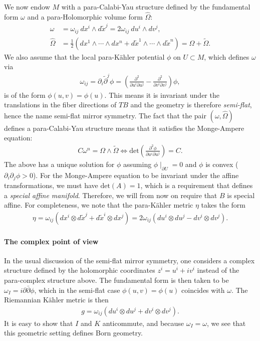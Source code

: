 \documentclass[letterpaper,12pt]{article}
\def\w{\wedge}
\newcommand{\p}{\partial}
\newcommand{\pt}{\tilde{\partial}}
\newcommand{\xt}{{\tilde{x}}}
\def\tl{\tilde}
\theoremstyle{definition}
\theoremstyle{remark}
\theoremstyle{examples}
\begin{document}
We now endow $M$ with a para-Calabi-Yau structure defined by the fundamental form $\omega$ and a para-Holomorphic volume form $\hat{\Omega}$:
\begin{align*}
    \omega&=\omega_{ij}\ dx^i\w d \xt^j=2\omega_{ij}\ du^i\w dv^j,\\
    \hat{\Omega} &=\frac{1}{2} (dx^1\w\cdots\w dx^n+d\xt^1\w\cdots\w d\xt^n)=\Omega+\tl{\Omega}.
\end{align*}
We also assume that the local para-K\"ahler potential $\phi$ on $U\subset M$, which defines $\omega$ via
\begin{align*}
\omega_{ij}=\p_i\pt^j\phi=\left(\frac{\p^2}{\p u^i \p u^j}-\frac{\p^2}{\p v^i \p v^j}\right)\phi,
\end{align*}
is of the form $\phi(u,v)=\phi(u)$. This means it is invariant under the translations in the fiber directions of $TB$ and the geometry is therefore {\it semi-flat}, hence the name semi-flat mirror symmetry. The fact that the pair $(\omega,\hat{\Omega})$ defines a para-Calabi-Yau structure means that it satisfies the Monge-Ampere equation:
\begin{align*}
    C\omega^n=\Omega\w\tl{\Omega} \Longleftrightarrow   \text{det}(\frac{\p^2\phi}{\p u^i\p u^j})=C.
\end{align*}
The above has a unique solution for $\phi$ \cite{calabi1975construction} assuming $\phi\mid_{\p U}=0$ and $\phi$ is convex ($\p_i\p_j\phi>0$). For the Monge-Ampere equation to be invariant under the affine transformations, we must have $\text{det}(A)=1$, which is a requirement that defines a {\it special affine manifold}. Therefore, we will from now on require that $B$ is special affine. For completeness, we note that the para-K\"ahler metric $\eta$ takes the form
\begin{align*}
    \eta=\omega_{ij} (dx^i\otimes d\xt^j+d\xt^i\otimes dx^j)=2\omega_{ij}(du^i\otimes du^j-dv^i\otimes dv^j).
\end{align*}

\paragraph{The complex point of view}
In the usual discussion of the semi-flat mirror symmetry, one considers a complex structure defined by the holomorphic coordinates $z^i=u^i+iv^i$ instead of the para-complex structure above. The fundamental form is then taken to be $\omega_I=i\p\bar{\p}\phi$, which in the semi-flat case $\phi(u,v)=\phi(u)$ coincides with $\omega$. The Riemannian K\"ahler metric is then
\begin{align*}
    g=\omega_{ij}(du^i\otimes du^j+dv^i\otimes dv^j).
\end{align*}
It is easy to show that $I$ and $K$ anticommute, and because $\omega_I=\omega$, we see that this geometric setting defines Born geometry.
\newcommand{\uh}{\hat{u}}
\newcommand{\vh}{\hat{v}}
\newcommand{\xh}{\hat{x}}
\newcommand{\xth}{\hat{\xt}}
\end{document}
